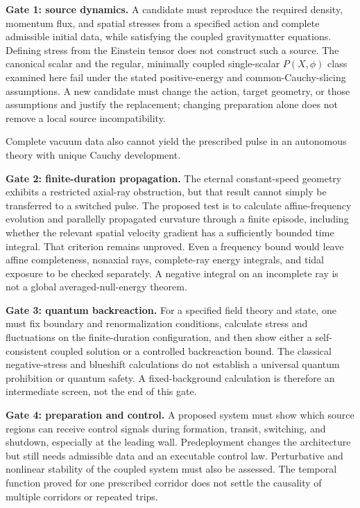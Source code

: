 \documentclass[11pt]{article}
\begin{document}
\textbf{Gate 1: source dynamics.} A candidate must reproduce the required density, momentum flux, and spatial stresses from a specified action and complete admissible initial data, while satisfying the coupled gravity\textendash{}\allowbreak{}matter equations. Defining stress from the Einstein tensor does not construct such a source. The canonical scalar and the regular, minimally coupled single-scalar $P(X,\phi)$ class examined here fail under the stated positive-energy and common-Cauchy-slicing assumptions. A new candidate must change the action, target geometry, or those assumptions and justify the replacement; changing preparation alone does not remove a local source incompatibility.

Complete vacuum data also cannot yield the prescribed pulse in an autonomous theory with unique Cauchy development.

\textbf{Gate 2: finite-duration propagation.} The eternal constant-speed geometry exhibits a restricted axial-ray obstruction, but that result cannot simply be transferred to a switched pulse. The proposed test is to calculate affine-frequency evolution and parallelly propagated curvature through a finite episode, including whether the relevant spatial velocity gradient has a sufficiently bounded time integral. That criterion remains unproved. Even a frequency bound would leave affine completeness, nonaxial rays, complete-ray energy integrals, and tidal exposure to be checked separately. A negative integral on an incomplete ray is not a global averaged-null-energy theorem.

\textbf{Gate 3: quantum backreaction.} For a specified field theory and state, one must fix boundary and renormalization conditions, calculate stress and fluctuations on the finite-duration configuration, and then show either a self-consistent coupled solution or a controlled backreaction bound. The classical negative-stress and blueshift calculations do not establish a universal quantum prohibition or quantum safety. A fixed-background calculation is therefore an intermediate screen, not the end of this gate.

\textbf{Gate 4: preparation and control.} A proposed system must show which source regions can receive control signals during formation, transit, switching, and shutdown, especially at the leading wall. Predeployment changes the architecture but still needs admissible data and an executable control law. Perturbative and nonlinear stability of the coupled system must also be assessed. The temporal function proved for one prescribed corridor does not settle the causality of multiple corridors or repeated trips.
\end{document}
